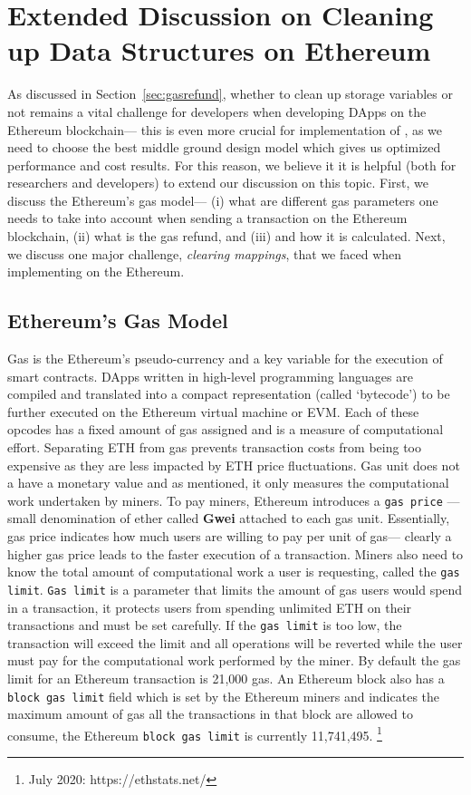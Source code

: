 

\section{Extended Discussion on Cleaning up Data Structures on Ethereum}

As discussed in Section~\ref{sec:gasrefund}, whether to clean up storage variables or not remains a vital challenge for developers when developing DApps on the Ethereum blockchain--- this is even more crucial for implementation of \cm, as we need to choose the best middle ground design model which gives us optimized performance and cost results. For this reason, we believe it it is helpful (both for researchers and developers) to extend our discussion on this topic. First, we discuss the Ethereum's gas model--- (i) what are different gas parameters one needs to take into account when sending a transaction on the Ethereum blockchain, (ii) what is the gas refund, and (iii) and how it is calculated.  Next, we discuss one major challenge, \textit{clearing mappings}, that we faced when implementing \cm on the Ethereum.


\subsection{Ethereum's Gas Model} 

Gas is the Ethereum's pseudo-currency and a key variable for the execution of smart contracts. DApps written in high-level programming languages are compiled and translated into a compact representation (called ‘bytecode’) to be further executed on the Ethereum virtual machine or EVM. Each of these opcodes has a fixed amount of gas assigned and is a measure of computational effort. Separating ETH from gas prevents transaction costs from being too expensive as they are less impacted by ETH price fluctuations. Gas unit does not a have a monetary value and as mentioned, it only  measures the computational work undertaken by miners. To pay miners, Ethereum introduces a \texttt{gas price} --- small denomination of ether called \textbf{Gwei} attached to each gas unit. Essentially, gas price indicates how much users are willing to pay per unit of gas--- clearly a higher gas price leads to the faster execution of a transaction. Miners also need to know the total amount of computational work a user is requesting, called the \texttt{gas limit}. \texttt{Gas limit} is a parameter that limits the amount of gas users would spend in a transaction, it protects users from spending unlimited ETH on their transactions and must be set carefully. If the \texttt{gas limit} is too low, the transaction will exceed the limit and all operations will be reverted while the user must pay for the computational work performed by the miner. By default the gas limit for an Ethereum transaction is 21,000 gas. An Ethereum block also has a \texttt{block gas limit} field which is set by the Ethereum miners and indicates the maximum amount of gas all the transactions in that block are allowed to consume, the Ethereum \texttt{block gas limit} is currently 11,741,495. \footnote{July 2020: https://ethstats.net/} 


